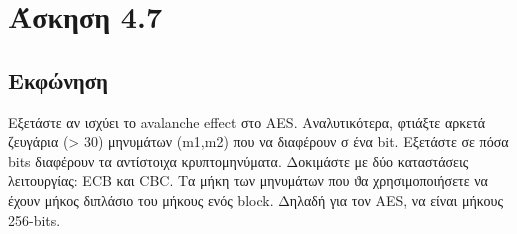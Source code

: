 \section{Άσκηση 4.7}

\subsection{Εκφώνηση}

Εξετάστε αν ισχύει το avalanche effect στο AES. Αναλυτικότερα, φτιάξτε αρκετά ζευγάρια (> 30) μηνυμάτων (m1,m2) που να διαφέρουν σ ένα bit. Εξετάστε σε πόσα bits διαφέρουν τα αντίστοιχα κρυπτομηνύματα. Δοκιμάστε με δύο καταστάσεις λειτουργίας: ECB και CBC. Τα μήκη των μηνυμάτων που ϑα χρησιμοποιήσετε να έχουν μήκος διπλάσιο του μήκους ενός block. Δηλαδή για τον AES, να είναι μήκους 256-bits.